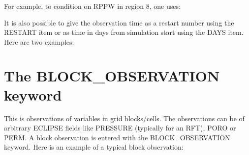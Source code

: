 \documentclass[letterpaper,10pt,english]{sphinxmanual}
\begin{document}
%
\begin{sphinxVerbatim}[commandchars=\\\{\}]
  
\end{sphinxVerbatim}

For example, to condition on RPPW in region 8, one uses:

%
\begin{sphinxVerbatim}[commandchars=\\\{\}]
  
\end{sphinxVerbatim}

It is also possible to give the observation time as a restart number
using the RESTART item or as time in days from simulation start using
the DAYS item. Here are two examples:

%
\begin{sphinxVerbatim}[commandchars=\\\{\}]
         
 
        
          
       
          


        
   
 
        
         
         
          
\end{sphinxVerbatim}


\section{The BLOCK\_OBSERVATION keyword}
\label{\detokenize{observations/index:the-block-observation-keyword}}
This is observations of variables in grid blocks/cells. The
observations can be of arbitrary ECLIPSE fields like PRESSURE
(typically for an RFT), PORO or PERM. A block observation is entered
with the BLOCK\_OBSERVATION keyword. Here is an example of a typical
block observation:
\end{document}
